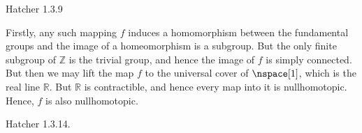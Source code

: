     \begin{problem}
        Hatcher 1.3.9
    \end{problem}
    \begin{solution}
        Firstly, any such mapping $f$ induces a homomorphism between the
        fundamental groups and the image of a homeomorphism is a subgroup. But
        the only finite subgroup of $\mathbb{Z}$ is the trivial group, and hence
        the image of $f$ is simply connected. But then we may lift the map $f$
        to the universal cover of $\nspace[1]$, which is the real line
        $\mathbb{R}$. But $\mathbb{R}$ is contractible, and hence every map into
        it is nullhomotopic. Hence, $f$ is also nullhomotopic.
    \end{solution}
    \begin{problem}
        Hatcher 1.3.14.
    \end{problem}
